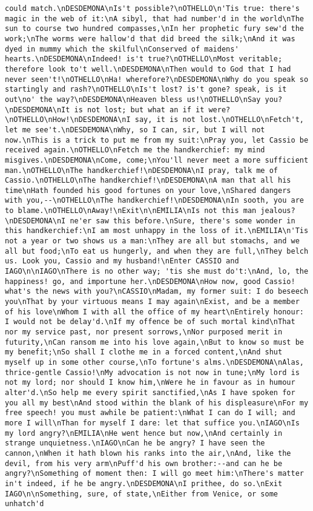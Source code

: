 \begin{verbatim}
could match.\nDESDEMONA\nIs't possible?\nOTHELLO\n'Tis true: there's magic in the web of it:\nA sibyl, that had number'd in the world\nThe sun to course two hundred compasses,\nIn her prophetic fury sew'd the work;\nThe worms were hallow'd that did breed the silk;\nAnd it was dyed in mummy which the skilful\nConserved of maidens' hearts.\nDESDEMONA\nIndeed! is't true?\nOTHELLO\nMost veritable; therefore look to't well.\nDESDEMONA\nThen would to God that I had never seen't!\nOTHELLO\nHa! wherefore?\nDESDEMONA\nWhy do you speak so startingly and rash?\nOTHELLO\nIs't lost? is't gone? speak, is it out\no' the way?\nDESDEMONA\nHeaven bless us!\nOTHELLO\nSay you?\nDESDEMONA\nIt is not lost; but what an if it were?\nOTHELLO\nHow!\nDESDEMONA\nI say, it is not lost.\nOTHELLO\nFetch't, let me see't.\nDESDEMONA\nWhy, so I can, sir, but I will not now.\nThis is a trick to put me from my suit:\nPray you, let Cassio be received again.\nOTHELLO\nFetch me the handkerchief: my mind misgives.\nDESDEMONA\nCome, come;\nYou'll never meet a more sufficient man.\nOTHELLO\nThe handkerchief!\nDESDEMONA\nI pray, talk me of Cassio.\nOTHELLO\nThe handkerchief!\nDESDEMONA\nA man that all his time\nHath founded his good fortunes on your love,\nShared dangers with you,--\nOTHELLO\nThe handkerchief!\nDESDEMONA\nIn sooth, you are to blame.\nOTHELLO\nAway!\nExit\n\nEMILIA\nIs not this man jealous?\nDESDEMONA\nI ne'er saw this before.\nSure, there's some wonder in this handkerchief:\nI am most unhappy in the loss of it.\nEMILIA\n'Tis not a year or two shows us a man:\nThey are all but stomachs, and we all but food;\nTo eat us hungerly, and when they are full,\nThey belch us. Look you, Cassio and my husband!\nEnter CASSIO and IAGO\n\nIAGO\nThere is no other way; 'tis she must do't:\nAnd, lo, the happiness! go, and importune her.\nDESDEMONA\nHow now, good Cassio! what's the news with you?\nCASSIO\nMadam, my former suit: I do beseech you\nThat by your virtuous means I may again\nExist, and be a member of his love\nWhom I with all the office of my heart\nEntirely honour: I would not be delay'd.\nIf my offence be of such mortal kind\nThat nor my service past, nor present sorrows,\nNor purposed merit in futurity,\nCan ransom me into his love again,\nBut to know so must be my benefit;\nSo shall I clothe me in a forced content,\nAnd shut myself up in some other course,\nTo fortune's alms.\nDESDEMONA\nAlas, thrice-gentle Cassio!\nMy advocation is not now in tune;\nMy lord is not my lord; nor should I know him,\nWere he in favour as in humour alter'd.\nSo help me every spirit sanctified,\nAs I have spoken for you all my best\nAnd stood within the blank of his displeasure\nFor my free speech! you must awhile be patient:\nWhat I can do I will; and more I will\nThan for myself I dare: let that suffice you.\nIAGO\nIs my lord angry?\nEMILIA\nHe went hence but now,\nAnd certainly in strange unquietness.\nIAGO\nCan he be angry? I have seen the cannon,\nWhen it hath blown his ranks into the air,\nAnd, like the devil, from his very arm\nPuff'd his own brother:--and can he be angry?\nSomething of moment then: I will go meet him:\nThere's matter in't indeed, if he be angry.\nDESDEMONA\nI prithee, do so.\nExit IAGO\n\nSomething, sure, of state,\nEither from Venice, or some unhatch'd 
\end{verbatim}
